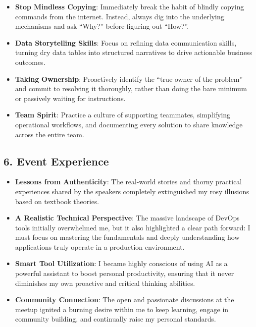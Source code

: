 \begin{itemize}
\tightlist
\item
  \textbf{Stop Mindless Copying}: Immediately break the habit of blindly
  copying commands from the internet. Instead, always dig into the
  underlying mechanisms and ask ``Why?'' before figuring out ``How?''.
\item
  \textbf{Data Storytelling Skills}: Focus on refining data
  communication skills, turning dry data tables into structured
  narratives to drive actionable business outcomes.
\item
  \textbf{Taking Ownership}: Proactively identify the ``true owner of
  the problem'' and commit to resolving it thoroughly, rather than doing
  the bare minimum or passively waiting for instructions.
\item
  \textbf{Team Spirit}: Practice a culture of supporting teammates,
  simplifying operational workflows, and documenting every solution to
  share knowledge across the entire team.
\end{itemize}

\hypertarget{event-experience}{%
\subsection{6. Event Experience}}

\begin{itemize}
\tightlist
\item
  \textbf{Lessons from Authenticity}: The real-world stories and thorny
  practical experiences shared by the speakers completely extinguished
  my rosy illusions based on textbook theories.
\item
  \textbf{A Realistic Technical Perspective}: The massive landscape of
  DevOps tools initially overwhelmed me, but it also highlighted a clear
  path forward: I must focus on mastering the fundamentals and deeply
  understanding how applications truly operate in a production
  environment.
\item
  \textbf{Smart Tool Utilization}: I became highly conscious of using AI
  as a powerful assistant to boost personal productivity, ensuring that
  it never diminishes my own proactive and critical thinking abilities.
\item
  \textbf{Community Connection}: The open and passionate discussions at
  the meetup ignited a burning desire within me to keep learning, engage
  in community building, and continually raise my personal standards.
\end{itemize}

